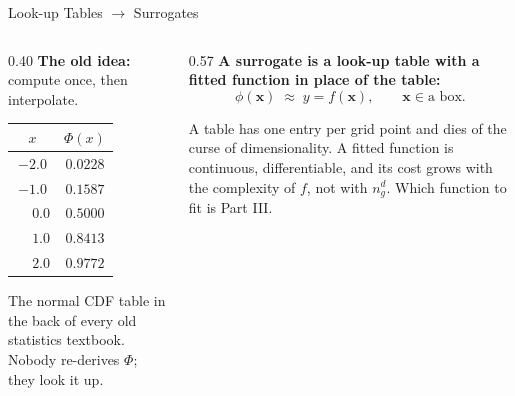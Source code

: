 \documentclass[aspectratio=169,11pt]{beamer}
\newcommand{\emphc}[1]{\textcolor{harvardcrimson}{#1}}
\newcommand{\x}{\bm{x}}
\newcommand{\surr}{\phi}                %
\begin{document}
\begin{frame}{Look-up Tables $\to$ Surrogates}
\begin{columns}[T]
\begin{column}{0.40\textwidth}
\textbf{The old idea:} compute once, then interpolate.
\vspace{2pt}
\begin{center}
\footnotesize
\begin{tabular}{cc}
\toprule
$x$ & $\Phi(x)$ \\
\midrule
$-2.0$ & $0.0228$ \\
$-1.0$ & $0.1587$ \\
$\phantom{-}0.0$ & $0.5000$ \\
$\phantom{-}1.0$ & $0.8413$ \\
$\phantom{-}2.0$ & $0.9772$ \\
\bottomrule
\end{tabular}
\end{center}
\vspace{2pt}
{\footnotesize The normal CDF table in the back of every old statistics textbook. Nobody re-derives $\Phi$; they look it up.}
\end{column}

\begin{column}{0.57\textwidth}
\textbf{A surrogate is a look-up table with a fitted function in place of the table:}
\[
\surr(\x) \;\approx\; y = f(\x), \qquad \x \in \text{a box}.
\]
\vspace{-6pt}
\begin{center}
\end{center}
\vspace{2pt}
{\footnotesize A table has one entry per grid point and dies of the curse of dimensionality. A fitted function is \emphc{continuous}, \emphc{differentiable}, and its cost grows with the complexity of $f$, not with $n_g^{d}$. Which function to fit is Part III.}
\end{column}
\end{columns}
\end{frame}
\end{document}
